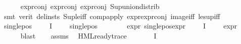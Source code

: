 \begin{isabellebody}
\ \ \ \ \isamarkupfalse%
\ expr{\isacharunderscore}{\kern0pt}{}{\isacharunderscore}{\kern0pt}conj\ expr{\isacharunderscore}{\kern0pt}{}{\isacharunderscore}{\kern0pt}conj\ expr{\isacharunderscore}{\kern0pt}{}{\isacharunderscore}{\kern0pt}conj\ Sup{\isacharunderscore}{\kern0pt}union{\isacharunderscore}{\kern0pt}distrib\ \isanewline
\ \ \ \ \isamarkupfalse%
\ {\isacharparenleft}{\kern0pt}smt\ {\isacharparenleft}{\kern0pt}verit{\isacharcomma}{\kern0pt}\ del{\isacharunderscore}{\kern0pt}insts{\isacharparenright}{\kern0pt}\ Sup{\isacharunderscore}{\kern0pt}le{\isacharunderscore}{\kern0pt}iff\ comp{\isacharunderscore}{\kern0pt}apply\ expr{\isacharunderscore}{\kern0pt}{}{\isachardot}{\kern0pt}expr{\isacharunderscore}{\kern0pt}{}{\isacharunderscore}{\kern0pt}conj\ image{\isacharunderscore}{\kern0pt}iff\ le{\isacharunderscore}{\kern0pt}sup{\isacharunderscore}{\kern0pt}iff{\isacharparenright}{\kern0pt}\isanewline
\ \ \isamarkupfalse%
\ single{\isacharunderscore}{\kern0pt}pos{\isacharunderscore}{\kern0pt}{\isasymchi}{\isacharcolon}{\kern0pt}\ {\isachardoublequoteopen}{\isasymforall}{\isasymchi}\ {\isasymin}\ {\isasymPhi}\ {\isacharbackquote}{\kern0pt}\ I{\isachardot}{\kern0pt}\ {\isasymchi}\ {\isasymnoteq}\ {\isasympsi}\ {\isasymlongrightarrow}\ single{\isacharunderscore}{\kern0pt}pos\ {\isasymchi}{\isachardoublequoteclose}\ \isanewline
\ \ \ \ \isamarkupfalse%
\ expr{\isacharunderscore}{\kern0pt}{}{\isacharunderscore}{\kern0pt}{}{\isacharunderscore}{\kern0pt}{}\ single{\isacharunderscore}{\kern0pt}pos{\isacharunderscore}{\kern0pt}expr\ {\isacartoucheopen}{\isasymforall}{\isasymchi}\ {\isasymin}\ {\isasymPhi}\ {\isacharbackquote}{\kern0pt}\ I{\isachardot}{\kern0pt}\ {\isasymchi}\ {\isasymnoteq}\ {\isasympsi}\ {\isasymlongrightarrow}\ expr{\isacharunderscore}{\kern0pt}{}\ {\isasymchi}\ {\isasymle}\ {}{\isacartoucheclose}\isanewline
\ \ \ \ \isamarkupfalse%
\ blast\isanewline
\ \ \isamarkupfalse%
\ assms{\isacharparenleft}{\kern0pt}{}{\isacharparenright}{\kern0pt}\ \isamarkupfalse%
\ {\isachardoublequoteopen}HML{\isacharunderscore}{\kern0pt}ready{\isacharunderscore}{\kern0pt}trace\ {\isasympsi}{\isachardoublequoteclose}\ \isamarkupfalse%
\ {\isacartoucheopen}{\isasympsi}\ {\isasymin}\ {\isacharparenleft}{\kern0pt}{\isasymPhi}\ {\isacharbackquote}{\kern0pt}\ I{\isacharparenright}{\kern0pt}{\isacartoucheclose}\isanewline

\end{isabellebody}
